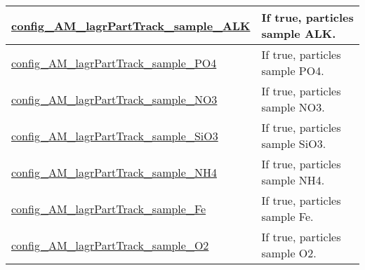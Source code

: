 {\begin{center}
\begin{longtable}{| p{2.0in} || p{4.0in} |}
    \hline
    \hyperref[subsec:nm_sec_config_AM_lagrPartTrack_sample_ALK]{config\_AM\_lagrPartTrack\_\-sample\_ALK} & If true, particles sample ALK. \\
    \hline
    \hyperref[subsec:nm_sec_config_AM_lagrPartTrack_sample_PO4]{config\_AM\_lagrPartTrack\_\-sample\_PO4} & If true, particles sample PO4. \\
    \hline
    \hyperref[subsec:nm_sec_config_AM_lagrPartTrack_sample_NO3]{config\_AM\_lagrPartTrack\_\-sample\_NO3} & If true, particles sample NO3. \\
    \hline
    \hyperref[subsec:nm_sec_config_AM_lagrPartTrack_sample_SiO3]{config\_AM\_lagrPartTrack\_\-sample\_SiO3} & If true, particles sample SiO3. \\
    \hline
    \hyperref[subsec:nm_sec_config_AM_lagrPartTrack_sample_NH4]{config\_AM\_lagrPartTrack\_\-sample\_NH4} & If true, particles sample NH4. \\
    \hline
    \hyperref[subsec:nm_sec_config_AM_lagrPartTrack_sample_Fe]{config\_AM\_lagrPartTrack\_\-sample\_Fe} & If true, particles sample Fe. \\
    \hline
    \hyperref[subsec:nm_sec_config_AM_lagrPartTrack_sample_O2]{config\_AM\_lagrPartTrack\_\-sample\_O2} & If true, particles sample O2. \\
    \hline
\end{longtable}
\end{center}
}
